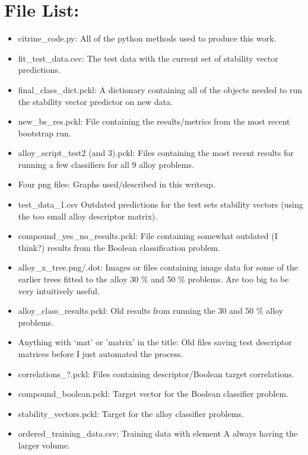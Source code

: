 \documentclass[11pt]{article}
\begin{document}
\section{File List:}
\begin{itemize}
\item citrine\_code.py: All of the python methods used to produce this work.
\item fit\_test\_data.csv: The test data with the current set of stability vector predictions.
\item final\_class\_dict.pckl: A dictionary containing all of the objects needed to run the stability vector predictor on new data.
\item new\_bs\_res.pckl: File containing the results/metrics from the most recent bootstrap run.
\item alloy\_script\_test2  (and 3).pckl: Files containing the most recent results for running a few classifiers for all 9 alloy problems.
\item Four png files: Graphs used/described in this writeup.
\item test\_data\_1.csv Outdated predictions for the test sets stability vectors (using the too small alloy descriptor matrix).
\item compound\_yes\_no\_results.pckl: File containing somewhat outdated (I think?) results from the Boolean classification problem.
\item alloy\_x\_tree.png/.dot: Images or files containing image data for some of the earlier trees fitted to the alloy 30 \% and 50 \% problems. Are too big to be very intuitively useful.
\item alloy\_class\_results.pckl: Old results from running the 30 and 50 \% alloy problems.
\item Anything with `mat' or 'matrix' in the title: Old files saving test descriptor matrices before I just automated the process.
\item correlations\_?.pckl: Files containing descriptor/Boolean target correlations.
\item compound\_boolean.pckl: Target vector for the Boolean classifier problem.
\item stability\_vectors.pckl: Target for the alloy classifier problems.
\item ordered\_training\_data.csv: Training data with element A always having the larger volume.
\end{itemize}
\end{document}
